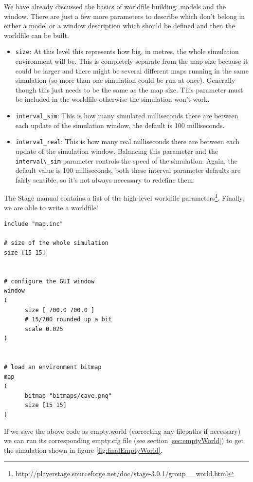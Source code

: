 \documentclass[a4paper]{article}
\begin{document}
We have already discussed the basics of worldfile building: models and the window. There are just a few more parameters to describe which don't belong in either a model or a window description which should be defined and then the worldfile can be built.
\begin{itemize}
\item \verb|size|: At this level this represents how big, in metres, the whole simulation environment will be. This is completely separate from the map size because it could be larger and there might be several different maps running in the same simulation (so more than one simulation could be run at once). Generally though this just needs to be the same as the map size. This parameter must be included in the worldfile otherwise the simulation won't work.
\item \verb|interval_sim|: This is how many simulated milliseconds there are between each update of the simulation window, the default is 100 milliseconds.
\item \verb|interval_real|: This is how many real milliseconds there are between each update of the simulation window. Balancing this parameter and the \verb|interval\_sim| parameter controls the speed of the simulation. Again, the default value is 100 milliseconds, both these interval parameter defaults are fairly sensible, so it's not always necessary to redefine them.
\end{itemize}
The Stage manual contains a list of the high-level worldfile parameters\footnote{http://playerstage.sourceforge.net/doc/stage-3.0.1/group\_\_world.html}.\newline
Finally, we are able to write a worldfile!
\begin{verbatim}
include "map.inc"

# size of the whole simulation
size [15 15]


# configure the GUI window
window
( 
      size [ 700.0 700.0 ] 
      # 15/700 rounded up a bit
	  scale 0.025
)


# load an environment bitmap
map
(
      bitmap "bitmaps/cave.png"
      size [15 15]	
)
\end{verbatim}
If we save the above code as empty.world (correcting any filepaths if necessary) we can run its corresponding empty.cfg file (see section \ref{sec:emptyWorld}) to get the simulation shown in figure \ref{fig:finalEmptyWorld}.
\end{document}
